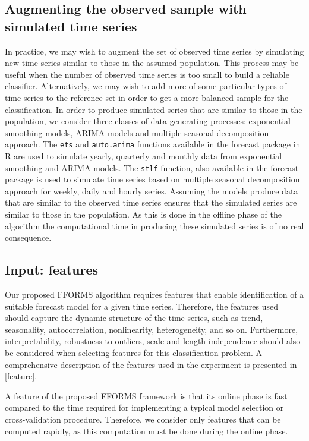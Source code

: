\documentclass[11pt,a4paper,]{article}
\begin{document}
\hypertarget{simulatingseries}{%
\subsection{Augmenting the observed sample with simulated time series}\label{simulatingseries}}

In practice, we may wish to augment the set of observed time series by simulating new time series similar to those in the assumed population. This process may be useful when the number of observed time series is too small to build a reliable classifier. Alternatively, we may wish to add more of some particular types of time series to the reference set in order to get a more balanced sample for the classification. In order to produce simulated series that are similar to those in the population, we consider three classes of data generating processes: exponential smoothing models, ARIMA models and multiple seasonal decomposition approach. The \texttt{ets} and \texttt{auto.arima} functions available in the forecast package in R \autocite{forecast} are used to simulate yearly, quarterly and monthly data from exponential smoothing and ARIMA models. The \texttt{stlf} function, also available in the forecast package is used to simulate time series based on multiple seasonal decomposition approach for weekly, daily and hourly series. Assuming the models produce data that are similar to the observed time series ensures that the simulated series are similar to those in the population. As this is done in the offline phase of the algorithm the computational time in producing these simulated series is of no real consequence.

\hypertarget{input-features}{%
\subsection{Input: features}\label{input-features}}

Our proposed FFORMS algorithm requires features that enable identification of a suitable forecast model for a given time series. Therefore, the features used should capture the dynamic structure of the time series, such as trend, seasonality, autocorrelation, nonlinearity, heterogeneity, and so on. Furthermore, interpretability, robustness to outliers, scale and length independence should also be considered when selecting features for this classification problem. A comprehensive description of the features used in the experiment is presented in \autoref{feature}.

A feature of the proposed FFORMS framework is that its online phase is fast compared to the time required for implementing a typical model selection or cross-validation procedure. Therefore, we consider only features that can be computed rapidly, as this computation must be done during the online phase.
\end{document}
